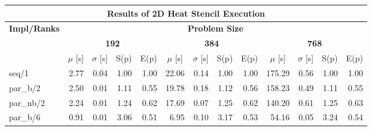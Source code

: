 \begin{tabular}{|lllllllllllll|}
\hline
\multicolumn{13}{|c|}{\textbf{Results of 2D Heat Stencil Execution}} \\ \hline
\multicolumn{1}{|c|}{\textbf{Impl/Ranks}} & \multicolumn{12}{c|}{\textbf{Problem Size}} \\ \hline
\multicolumn{1}{|c|}{\textbf{}} & \multicolumn{4}{c|}{\textbf{192}} & \multicolumn{4}{c|}{\textbf{384}} & \multicolumn{4}{c|}{\textbf{768}} \\ \hline
\multicolumn{1}{|l|}{} & \multicolumn{1}{c|}{$\mu$ [s]} & \multicolumn{1}{c|}{$\sigma$ [s]} & \multicolumn{1}{c|}{S(p)} & \multicolumn{1}{c|}{E(p)} & \multicolumn{1}{c|}{$\mu$ [s]} & \multicolumn{1}{c|}{$\sigma$ [s]} & \multicolumn{1}{c|}{S(p)} & \multicolumn{1}{c|}{E(p)} & \multicolumn{1}{c|}{$\mu$ [s]} & \multicolumn{1}{c|}{$\sigma$ [s]} & \multicolumn{1}{c|}{S(p)} & \multicolumn{1}{c|}{E(p)} \\ \hline
\multicolumn{1}{|l|}{seq/1}  & \multicolumn{1}{r|}{2.77} & \multicolumn{1}{r|}{0.04} & \multicolumn{1}{r|}{1.00} & \multicolumn{1}{r|}{1.00}  & \multicolumn{1}{r|}{22.06} & \multicolumn{1}{r|}{0.14} & \multicolumn{1}{r|}{1.00} & \multicolumn{1}{r|}{1.00}  & \multicolumn{1}{r|}{175.29} & \multicolumn{1}{r|}{0.56} & \multicolumn{1}{r|}{1.00} & \multicolumn{1}{r|}{1.00}  \\ \hline
\multicolumn{1}{|l|}{par\_b/2}  & \multicolumn{1}{r|}{2.50} & \multicolumn{1}{r|}{0.01} & \multicolumn{1}{r|}{1.11} & \multicolumn{1}{r|}{0.55}  & \multicolumn{1}{r|}{19.78} & \multicolumn{1}{r|}{0.18} & \multicolumn{1}{r|}{1.12} & \multicolumn{1}{r|}{0.56}  & \multicolumn{1}{r|}{158.23} & \multicolumn{1}{r|}{0.49} & \multicolumn{1}{r|}{1.11} & \multicolumn{1}{r|}{0.55}  \\ \hline
\multicolumn{1}{|l|}{par\_nb/2}  & \multicolumn{1}{r|}{2.24} & \multicolumn{1}{r|}{0.01} & \multicolumn{1}{r|}{1.24} & \multicolumn{1}{r|}{0.62}  & \multicolumn{1}{r|}{17.69} & \multicolumn{1}{r|}{0.07} & \multicolumn{1}{r|}{1.25} & \multicolumn{1}{r|}{0.62}  & \multicolumn{1}{r|}{140.20} & \multicolumn{1}{r|}{0.61} & \multicolumn{1}{r|}{1.25} & \multicolumn{1}{r|}{0.63}  \\ \hline
\multicolumn{1}{|l|}{par\_b/6}  & \multicolumn{1}{r|}{0.91} & \multicolumn{1}{r|}{0.01} & \multicolumn{1}{r|}{3.06} & \multicolumn{1}{r|}{0.51}  & \multicolumn{1}{r|}{6.95} & \multicolumn{1}{r|}{0.10} & \multicolumn{1}{r|}{3.17} & \multicolumn{1}{r|}{0.53}  & \multicolumn{1}{r|}{54.16} & \multicolumn{1}{r|}{0.05} & \multicolumn{1}{r|}{3.24} & \multicolumn{1}{r|}{0.54}  \\ \hline

\end{tabular}
